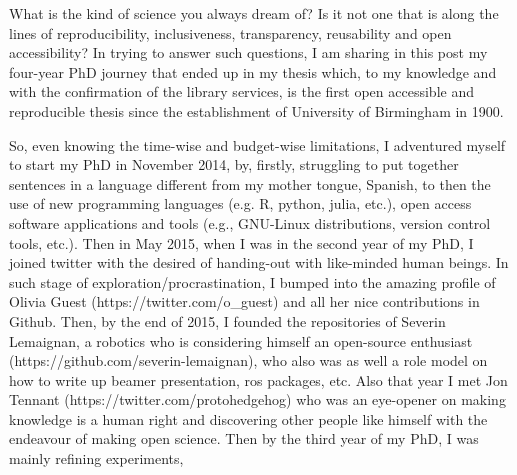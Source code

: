 \documentclass[11pt]{article}
\begin{document}
What is the kind of science you always dream of? Is it not one that is
along the lines of reproducibility, inclusiveness, transparency,
reusability  and open accessibility?
In trying to answer such questions, I am sharing in this post
my four-year PhD journey that ended up in my thesis which, 
to my knowledge and with the confirmation of the library services,
is the first open accessible and reproducible thesis
since the establishment of University of Birmingham in 1900.

So, even knowing the time-wise and budget-wise limitations,
I adventured myself to start my PhD in November 2014, 
by, firstly, struggling to put together sentences in a language
different from my mother tongue, Spanish, to then 
the use of new programming languages (e.g. R, python, julia, etc.), 
open access software applications and tools 
(e.g., GNU-Linux distributions, version control tools, etc.).  
Then in May 2015, when I was in the second year of my PhD, I joined twitter 
with the desired of handing-out with like-minded human beings. 
In such stage of exploration/procrastination, I bumped into the amazing 
profile of Olivia Guest (https://twitter.com/o\_guest) and
all her nice contributions in Github. 
Then, by the end of 2015, I founded the repositories of 
Severin Lemaignan, a robotics who is considering himself
an open-source enthusiast (https://github.com/severin-lemaignan),
who also was as well a role model on how to write up beamer
presentation, ros packages, etc. 
Also that year I met Jon Tennant (https://twitter.com/protohedgehog) 
who was an eye-opener on making knowledge is a human right
and discovering other people like himself with the endeavour of making open science.
Then by the third year of my PhD, I was mainly refining experiments, 
\end{document}

